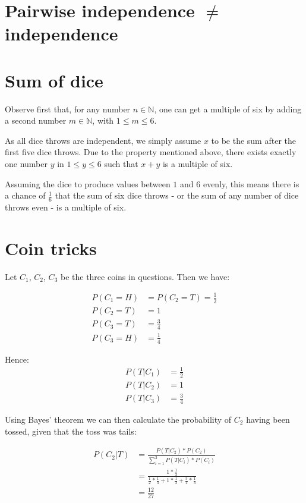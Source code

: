 \documentclass[a4paper]{scrreprt}
\begin{document}
\section{Pairwise independence $\neq$ independence}

\section{Sum of dice}

Observe first that, for any number $n \in \mathbb{N}$, one can get a multiple
of six by adding a second number $m \in \mathbb{N}$, with $1 \leq m \leq 6$.

As all dice throws are independent, we simply assume $x$ to be the sum after
the first five dice throws. Due to the property mentioned above, there exists
exactly one number $y$ in $1 \leq y \leq 6$ such that $x + y$ is a multiple of
six.

Assuming the dice to produce values between $1$ and $6$ evenly, this means
there is a chance of $\frac{1}{6}$ that the sum of six dice throws - or the sum
of any number of dice throws even - is a multiple of six.

\section{Coin tricks}

Let $C_1$, $C_2$, $C_3$ be the three coins in questions. Then we have:

\begin{align*}
	P(C_1=H) &= P(C_2=T) = \frac{1}{2} \\
	P(C_2=T) &= 1 \\
	P(C_3=T) &= \frac{3}{4} \\
	P(C_3=H) &= \frac{1}{4}
\end{align*}

Hence:
\begin{align*}
	P(T | C_1) & = \frac{1}{2} \\
	P(T | C_2) & = 1 \\
	P(T | C_3) & = \frac{3}{4}
\end{align*}

Using Bayes' theorem we can then calculate the probability of $C_2$ having been
tossed, given that the toss was tails:

\begin{align*}
	P(C_2 | T) & = \frac{P(T | C_2) * P(C_2)}{\sum_{i=1}^3{P(T | C_i) * P(C_i)}} \\
		   & = \frac{1 * \frac{1}{3}}{\frac{1}{2} * \frac{1}{3} + 1 * \frac{1}{3} + \frac{3}{4} * \frac{1}{3}} \\
		   & = \frac{12}{27}
\end{align*}
\end{document}
